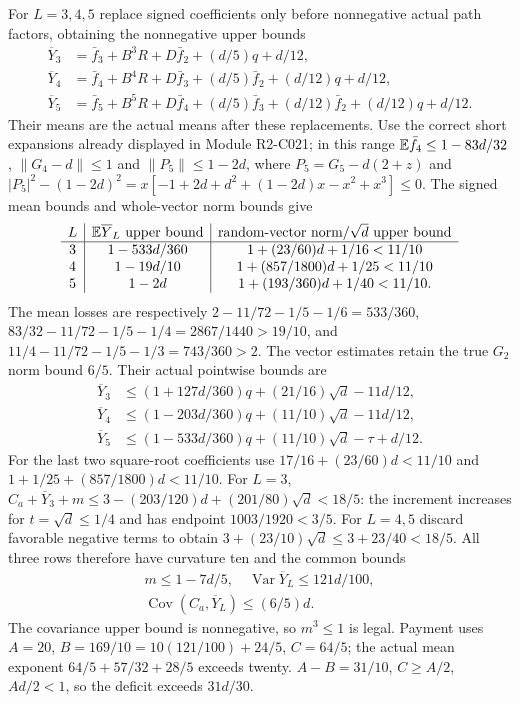 For $L=3,4,5$ replace signed coefficients only before nonnegative
actual path factors, obtaining the nonnegative upper bounds
\begin{equation}\tag{R22.6.1}\label{eq:R22:short}
\begin{aligned}
\overline Y_3&=\bar f_3+B^3R+D\bar f_2+(d/5)q+d/12,\\
\overline Y_4&=\bar f_4+B^4R+D\bar f_3+(d/5)\bar f_2+(d/12)q+d/12,\\
\overline Y_5&=\bar f_5+B^5R+D\bar f_4+(d/5)\bar f_3
+(d/12)\bar f_2+(d/12)q+d/12.
\end{aligned}
\end{equation}
Their means are the actual means after these replacements.
Use the correct short expansions already displayed in Module R2-C021;
in this range $\mathbb E\bar f_4\le1-83d/32$,
$\|G_4-d\|\le1$ and $\|P_5\|\le1-2d$, where
$P_5=G_5-d(2+z)$ and
$|P_5|^2-(1-2d)^2=x[-1+2d+d^2+(1-2d)x-x^2+x^3]\le0$.
The signed mean bounds and whole-vector norm bounds give
\[
\begin{array}{c|c|c}
L&\mathbb E\overline Y_L\text{ upper bound}
&\text{random-vector norm}/\sqrt d\text{ upper bound}\\\hline
3&1-533d/360&1+(23/60)d+1/16<11/10\\
4&1-19d/10&1+(857/1800)d+1/25<11/10\\
5&1-2d&1+(193/360)d+1/40<11/10.
\end{array}
\]
The mean losses are respectively
$2-11/72-1/5-1/6=533/360$,
$83/32-11/72-1/5-1/4=2867/1440>19/10$, and
$11/4-11/72-1/5-1/3=743/360>2$.
The vector estimates retain the true $G_2$ norm bound $6/5$.
Their actual pointwise bounds are
\[
\begin{aligned}
\overline Y_3&\le(1+127d/360)q+(21/16)\sqrt d-11d/12,\\
\overline Y_4&\le(1-203d/360)q+(11/10)\sqrt d-11d/12,\\
\overline Y_5&\le(1-533d/360)q+(11/10)\sqrt d-\tau+d/12.
\end{aligned}
\]
For the last two square-root coefficients use
$17/16+(23/60)d<11/10$ and
$1+1/25+(857/1800)d<11/10$.
For $L=3$, $C_a+\overline Y_3+m
\le3-(203/120)d+(201/80)\sqrt d<18/5$:
the increment increases for $t=\sqrt d\le1/4$ and has endpoint
$1003/1920<3/5$. For $L=4,5$ discard favorable negative terms to
obtain $3+(23/10)\sqrt d\le3+23/40<18/5$.
All three rows therefore have curvature ten and the common bounds
\[
\begin{gathered}
m\le1-7d/5,\quad \operatorname{Var}\overline Y_L\le121d/100,\\
\operatorname{Cov}(C_a,\overline Y_L)\le(6/5)d.
\end{gathered}
\]
The covariance upper bound is nonnegative, so $m^3\le1$ is legal.
Payment uses $A=20$, $B=169/10=10(121/100)+24/5$, $C=64/5$;
the actual mean exponent $64/5+57/32+28/5$ exceeds twenty.
$A-B=31/10$, $C\ge A/2$, $Ad/2<1$, so the deficit exceeds $31d/30$.

